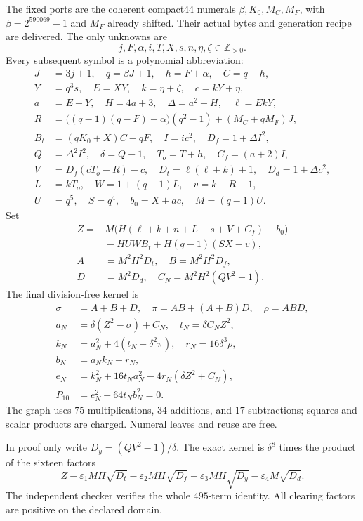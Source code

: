 The fixed ports are the coherent compact44 numerals
$\beta,K_0,M_C,M_F$, with $\beta=2^{590069}-1$ and $M_F$ already shifted.
Their actual bytes and generation recipe are delivered. The only unknowns are
\[
 j,F,\alpha,i,T,X,s,n,\eta,\zeta\in\mathbb Z_{>0}.
\]
Every subsequent symbol is a polynomial abbreviation:
\begin{align*}
 J&=3j+1,\quad  q=\beta J+1,\quad  h=F+\alpha,\quad  C=q-h,\\
 Y&=q^3s,\quad  E=XY,\quad  k=\eta+\zeta,\quad  c=kY+\eta,\\
 a&=E+Y,\quad  H=4a+3,\quad  \Delta=a^2+H,\quad  \ell=EkY,\\
 R&=\bigl((q-1)(q-F)+\alpha\bigr)(q^2-1)+(M_C+qM_F)J,\\
 B_t&=(qK_0+X)C-qF,\quad  I=ic^2,\quad  D_f=1+\Delta I^2,\\
 Q&=\Delta^2I^2,\quad  \delta=Q-1,\quad  T_o=T+h,\quad  C_f=(a+2)I,\\
 V&=D_f(cT_o-R)-c,\quad D_t=\ell(\ell+k)+1,\quad D_d=1+\Delta c^2,\\
 L&=kT_o,\quad W=1+(q-1)L,\quad v=k-R-1,\\
 U&=q^5,\quad S=q^4,\quad b_0=X+ac,\quad M=(q-1)U.
\end{align*}
Set
\begin{align*}
 Z={}&M\bigl(H(\ell+k+n+L+s+V+C_f)+b_0\bigr)
       \\ &{}-HUWB_t+H(q-1)(SX-v),\\
 A&=M^2H^2D_t,\quad B=M^2H^2D_f,\\
 D&=M^2D_d,\quad C_N=M^2H^2(QV^2-1).
\end{align*}
The final division-free kernel is
\begin{align*}
 \sigma&=A+B+D,\quad \pi=AB+(A+B)D,\quad \rho=ABD,\\
 a_N&=\delta(Z^2-\sigma)+C_N,\quad t_N=\delta C_NZ^2,\\
 k_N&=a_N^2+4(t_N-\delta^2\pi),\quad r_N=16\delta^3\rho,\\
 b_N&=a_Nk_N-r_N,\\
 e_N&=k_N^2+16t_Na_N^2-4r_N(\delta Z^2+C_N),\\
 \boxed{P_{10}}&\boxed{{}=e_N^2-64t_Nb_N^2=0.}
\end{align*}
The graph uses $75$ multiplications, $34$ additions, and $17$ subtractions;
squares and scalar products are charged. Numeral leaves and reuse are free.

In proof only write $D_y=(QV^2-1)/\delta$. The exact kernel is $\delta^8$
times the product of the sixteen factors
\[
 Z-\varepsilon_1MH\sqrt{D_t}-\varepsilon_2MH\sqrt{D_f}
  -\varepsilon_3MH\sqrt{D_y}-\varepsilon_4M\sqrt{D_d}.
\]
The independent checker verifies the whole $495$-term identity.
All clearing factors are positive on the declared domain.

